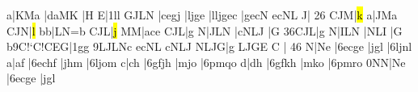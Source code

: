 \temps\notes\cu a|\sk{}\Tqbbu KMa\enotes
\temps\notes|\Qqbbu  daMK\enotes
\temps\Notes\sk\DEP|\cu H\dsoupir\enotes
%
\barre\notes\LPED\qsoupir{}E|\qsk\itenu1l\wh l\enotes
\temps\notes\Qqbbu GJLN\enotes
\temps\notes|\Qqbbu cegj\enotes
\temps\notes|\Qqbbu ljge\enotes
%
\barre\notes|\pt l\zhl l\Qqbbu jgec\enotes
\temps\notes|\Qqbbu gecN\enotes
\temps\notes\Qqbbu ecNL\enotes
\temps\notes\cu J\DEP\dsoupir|\soupir\enotes
%
\troistemps\changecontext{}26\relax
\notes\LPED\qsoupir\Tqbbh CJM|\qsk\hl k\enotes
\temps\notes\cu a\sk\DEP|\sk{}\Tqbbu JMa\enotes
\temps\notes\LPED\qsoupir\Tqbbh CJN|\qsk\hl l\enotes
\temps\notes\bigna b\cu b\sk\DEP|\sk{}\bigaccid\Tqbbu LN{=b}\enotes
\temps\notes\LPED\qsoupir\Tqbbh CJL|\qsk\hl j\enotes
\temps\notes\bigsh M\cu M\sk\DEP|\sk\Tqbbu ace\enotes
%
\deuxtemps\changecontext
\notes\LPED\qsoupir\Tqbbh CJL|\qsk\wh g\enotes
\temps\notes\cu N|\sk{}\Tqbbh JLN\enotes
\temps\notes|cNLJ\enotes
\temps\Notes\sk\DEP|\cu G\dsoupir\enotes
\barre{}36\notes\LPED\qsoupir\Tqbbh CJL|\qsk\wh g\enotes
\temps\notes\cu N|\sk{}\bigna ILN\enotes
\temps\notes|\bigaccid{}NLI\enotes
\temps\Notes\sk\DEP|\cu G\dsoupir\enotes
%
\barre\notes\LPED\qsoupir\cinqx b\qqbbH9C{!`C}{!C}EG|\qsk\itenu1g\wh g\enotes
\temps\notes\qqbbH9LJLNc\enotes
\temps\notes{}ecNL\enotes
\temps\notes{}cNLJ\enotes
%
\barre\notes{}NLJG|\hup g\enotes
\temps\notes{}LJGE\enotes
\temps\Notes\qu C\DEP\enotes
\temps\Notes\soupir|\soupir\enotes
%
\suspmorceau
\def\interfacteur{10}\computewidths
\preprmorceau{}46\relax
\notes\LPED{}\wh N|\dsoupir\dqbh Ne\enotes
\temps\notes|\tqbH6ecge\enotes
\temps\notes|\Tqbh jgl\enotes
\temps\notes\sk\DEP|\tqbH6ljnl\enotes
\barre\notes\LPED\wh a|\dsoupir\dqbh af\enotes
\temps\notes|\tqbH6echf\enotes
\temps\notes|\Tqbh jhm\enotes
\temps\notes\sk\DEP|\tqbH6ljom\enotes
\barre\notes\LPED\wh c|\dsoupir\dqbh ch\enotes
\temps\notes|\tqbH6gfjh\enotes
\temps\notes|\Tqbh mjo\enotes
\temps\notes\sk\DEP|\tqbH6pmqo\enotes
\barre\notes\LPED\wh d|\dsoupir\dqbh dh\enotes
\temps\notes|\tqbH6gfkh\enotes
\temps\notes|\Tqbh mko\enotes
\temps\notes\sk\DEP|\tqbH6pmro\enotes
\barre\notes\LPED\itenu0N\wh N|\dsoupir\dqbh Ne\enotes
\temps\notes|\tqbH6ecge\enotes
\temps\notes|\Tqbh jgl\enotes

